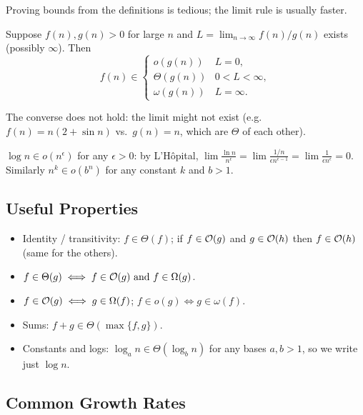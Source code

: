 Proving bounds from the definitions is tedious; the limit rule is usually faster.

\begin{theorem}
Suppose $f(n), g(n) > 0$ for large $n$ and $L = \lim_{n\to\infty} f(n)/g(n)$ exists
(possibly $\infty$). Then
\[
f(n) \in \begin{cases}
o(g(n)) & L = 0,\\
\Theta(g(n)) & 0 < L < \infty,\\
\omega(g(n)) & L = \infty.
\end{cases}
\]
\end{theorem}
The converse does not hold: the limit might not exist (e.g.\ $f(n) = n(2+\sin n)$
vs.\ $g(n) = n$, which are $\Theta$ of each other).

\begin{example}
$\log n \in o(n^\epsilon)$ for any $\epsilon > 0$: by L'H\^opital,
$\lim \frac{\ln n}{n^\epsilon} = \lim \frac{1/n}{\epsilon n^{\epsilon-1}}
= \lim \frac{1}{\epsilon n^\epsilon} = 0$. Similarly $n^k \in o(b^n)$ for any
constant $k$ and $b > 1$.
\end{example}

\subsection{Useful Properties}

\begin{itemize}
  \item Identity / transitivity: $f \in \Theta(f)$; if $f \in \mathcal{O}(g)$ and
        $g \in \mathcal{O}(h)$ then $f \in \mathcal{O}(h)$ (same for the others).
  \item $f \in \Theta(g) \iff f \in \mathcal{O}(g) \text{ and } f \in \Omega(g)$.
  \item $f \in \mathcal{O}(g) \iff g \in \Omega(f)$; $f \in o(g) \iff g \in \omega(f)$.
  \item Sums: $f + g \in \Theta(\max\{f, g\})$.
  \item Constants and logs: $\log_a n \in \Theta(\log_b n)$ for any bases $a,b>1$, so
        we write just $\log n$.
\end{itemize}

\subsection{Common Growth Rates}

